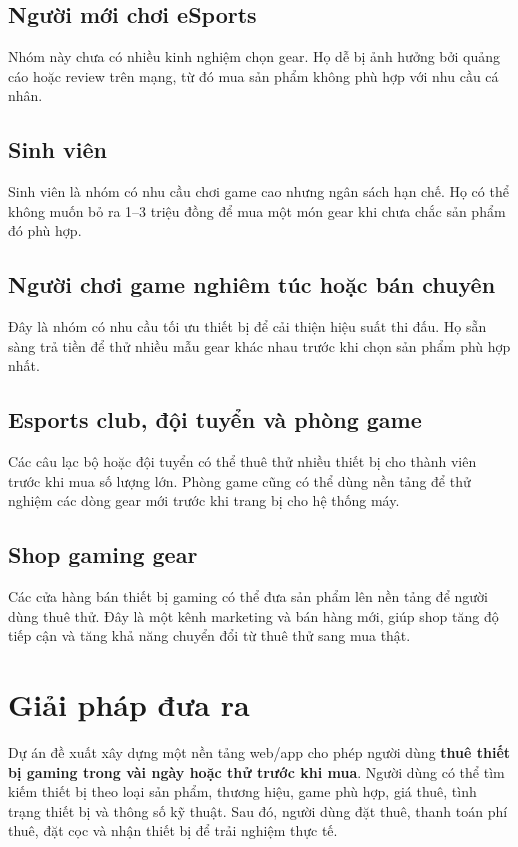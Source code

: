 \subsection{Người mới chơi eSports}

Nhóm này chưa có nhiều kinh nghiệm chọn gear. Họ dễ bị ảnh hưởng bởi quảng cáo hoặc review trên mạng, từ đó mua sản phẩm không phù hợp với nhu cầu cá nhân.

\subsection{Sinh viên}

Sinh viên là nhóm có nhu cầu chơi game cao nhưng ngân sách hạn chế. Họ có thể không muốn bỏ ra 1--3 triệu đồng để mua một món gear khi chưa chắc sản phẩm đó phù hợp.

\subsection{Người chơi game nghiêm túc hoặc bán chuyên}

Đây là nhóm có nhu cầu tối ưu thiết bị để cải thiện hiệu suất thi đấu. Họ sẵn sàng trả tiền để thử nhiều mẫu gear khác nhau trước khi chọn sản phẩm phù hợp nhất.

\subsection{Esports club, đội tuyển và phòng game}

Các câu lạc bộ hoặc đội tuyển có thể thuê thử nhiều thiết bị cho thành viên trước khi mua số lượng lớn. Phòng game cũng có thể dùng nền tảng để thử nghiệm các dòng gear mới trước khi trang bị cho hệ thống máy.

\subsection{Shop gaming gear}

Các cửa hàng bán thiết bị gaming có thể đưa sản phẩm lên nền tảng để người dùng thuê thử. Đây là một kênh marketing và bán hàng mới, giúp shop tăng độ tiếp cận và tăng khả năng chuyển đổi từ thuê thử sang mua thật.

\section{Giải pháp đưa ra}

Dự án đề xuất xây dựng một nền tảng web/app cho phép người dùng \textbf{thuê thiết bị gaming trong vài ngày hoặc thử trước khi mua}. Người dùng có thể tìm kiếm thiết bị theo loại sản phẩm, thương hiệu, game phù hợp, giá thuê, tình trạng thiết bị và thông số kỹ thuật. Sau đó, người dùng đặt thuê, thanh toán phí thuê, đặt cọc và nhận thiết bị để trải nghiệm thực tế.

